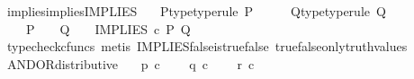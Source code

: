 \begin{isabellebody}
\endisatagproof
{\isafoldproof}%
%
\isadelimproof
\isanewline
%
\endisadelimproof
\isanewline
{}\isamarkupfalse%
\ implies{\isacharunderscore}{\kern0pt}implies{\isacharunderscore}{\kern0pt}IMPLIES{\isacharcolon}{\kern0pt}\isanewline
\ \ \ P{\isacharunderscore}{\kern0pt}type{\isacharbrackleft}{\kern0pt}type{\isacharunderscore}{\kern0pt}rule{\isacharbrackright}{\kern0pt}{\isacharcolon}{\kern0pt}\ {\isachardoublequoteopen}P\ {\isacharcolon}{\kern0pt}\ {\isasymone}\ {\isasymrightarrow}\ {\isasymOmega}{\isachardoublequoteclose}\ \ Q{\isacharunderscore}{\kern0pt}type{\isacharbrackleft}{\kern0pt}type{\isacharunderscore}{\kern0pt}rule{\isacharbrackright}{\kern0pt}{\isacharcolon}{\kern0pt}\ {\isachardoublequoteopen}Q\ {\isacharcolon}{\kern0pt}\ {\isasymone}\ {\isasymrightarrow}\ {\isasymOmega}{\isachardoublequoteclose}\isanewline
\ \ \ \ {\isachardoublequoteopen}{\isacharparenleft}{\kern0pt}P\ {\isacharequal}{\kern0pt}\ {\isasymt}\ {\isasymLongrightarrow}\ Q\ {\isacharequal}{\kern0pt}\ {\isasymt}{\isacharparenright}{\kern0pt}\ {\isasymLongrightarrow}\ IMPLIES\ {\isasymcirc}\isactrlsub c\ {\isasymlangle}P{\isacharcomma}{\kern0pt}\ Q{\isasymrangle}\ {\isacharequal}{\kern0pt}\ {\isasymt}{\isachardoublequoteclose}\isanewline
%
\isadelimproof
\ \ %
\endisadelimproof
%
\isatagproof
{}\isamarkupfalse%
\ {\isacharparenleft}{\kern0pt}typecheck{\isacharunderscore}{\kern0pt}cfuncs{\isacharcomma}{\kern0pt}\ metis\ IMPLIES{\isacharunderscore}{\kern0pt}false{\isacharunderscore}{\kern0pt}is{\isacharunderscore}{\kern0pt}true{\isacharunderscore}{\kern0pt}false\ true{\isacharunderscore}{\kern0pt}false{\isacharunderscore}{\kern0pt}only{\isacharunderscore}{\kern0pt}truth{\isacharunderscore}{\kern0pt}values{\isacharparenright}{\kern0pt}%
\endisatagproof
{\isafoldproof}%
%
\isadelimproof
%
\endisadelimproof
%
\isadelimdocument
%
\endisadelimdocument
%
\isatagdocument
%
\isamarkuptrue%
%
\endisatagdocument
{\isafolddocument}%
%
\isadelimdocument
%
\endisadelimdocument
{}\isamarkupfalse%
\ AND{\isacharunderscore}{\kern0pt}OR{\isacharunderscore}{\kern0pt}distributive{\isacharcolon}{\kern0pt}\isanewline
\ \ \ {\isachardoublequoteopen}p\ {\isasymin}\isactrlsub c\ {\isasymOmega}{\isachardoublequoteclose}\isanewline
\ \ \ {\isachardoublequoteopen}q\ {\isasymin}\isactrlsub c\ {\isasymOmega}{\isachardoublequoteclose}\isanewline
\ \ \ {\isachardoublequoteopen}r\ {\isasymin}\isactrlsub c\ {\isasymOmega}{\isachardoublequoteclose}\isanewline

\end{isabellebody}
